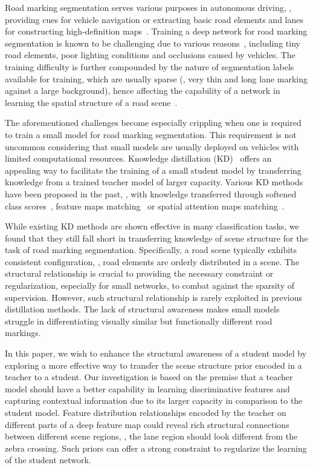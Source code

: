 \documentclass[10pt,twocolumn,letterpaper]{article}
\begin{document}
Road marking segmentation serves various purposes in autonomous driving, \eg, providing cues for vehicle navigation or extracting basic road elements and lanes for constructing high-definition maps~\cite{Homayounfar_2019_ICCV}. 
Training a deep network for road marking segmentation is known to be challenging due to various reasons~\cite{hou2019learning}, including tiny road elements, poor lighting conditions and occlusions caused by vehicles.
The training difficulty is further compounded by the nature of segmentation labels available for training, which are usually sparse (\eg, very thin and long lane marking against a large background), hence affecting the capability of a network in learning the spatial structure of a road scene~\cite{hou2019learning,pan2017spatial}.


The aforementioned challenges become especially crippling when one is required to train a small model for road marking segmentation. This requirement is not uncommon considering that small models are usually deployed on vehicles with limited computational resources.
Knowledge distillation (KD)~\cite{hinton2015distilling} offers an appealing way to facilitate the training of a small student model by transferring knowledge from a trained teacher model of larger capacity.
Various KD methods have been proposed in the past, \eg, with knowledge transferred through softened class scores~\cite{hinton2015distilling}, feature maps matching~\cite{hou2019learningto,liu2019structured} or spatial attention maps matching~\cite{zagoruyko2016paying}.


While existing KD methods are shown effective in many classification tasks, we found that they still fall short in transferring knowledge of scene structure for the task of road marking segmentation. 
Specifically, a road scene typically exhibits consistent configuration, \ie, road elements are orderly distributed in a scene. The structural relationship is crucial to providing the necessary constraint or regularization, especially for small networks, to combat against the sparsity of supervision. However, such structural relationship is rarely exploited in previous distillation methods.
The lack of structural awareness makes small models struggle in differentiating visually similar but functionally different road markings.


In this paper, we wish to enhance the structural awareness of a student model by exploring a more effective way to transfer the scene structure prior encoded in a teacher to a student.
Our investigation is based on the premise that a teacher model should have a better capability in learning discriminative features and capturing contextual information due to its larger capacity in comparison to the student model. Feature distribution relationships encoded by the teacher on different parts of a deep feature map could reveal rich structural connections between different scene regions, \eg, the lane region should look different from the zebra crossing. Such priors can offer a strong constraint to regularize the learning of the student network.
\end{document}
